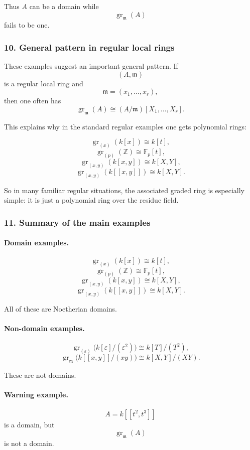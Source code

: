 \documentclass[12pt,a4paper]{article}
\theoremstyle{notespace}
\theoremstyle{definition}
\begin{document}
Thus \(A\) can be a domain while
\[
\operatorname{gr}_{\mathfrak m}(A)
\]
fails to be one.

\subsubsection{10. General pattern in regular local rings}

These examples suggest an important general pattern. If
\[
(A,\mathfrak m)
\]
is a regular local ring and
\[
\mathfrak m=(x_1,\dots,x_r),
\]
then one often has
\[
\operatorname{gr}_{\mathfrak m}(A)\cong (A/\mathfrak m)[X_1,\dots,X_r].
\]

This explains why in the standard regular examples one gets polynomial rings:

\[
\operatorname{gr}_{(x)}(k[x])\cong k[t],
\]
\[
\operatorname{gr}_{(p)}(\mathbb Z)\cong \mathbb F_p[t],
\]
\[
\operatorname{gr}_{(x,y)}(k[x,y])\cong k[X,Y],
\]
\[
\operatorname{gr}_{(x,y)}(k[[x,y]])\cong k[X,Y].
\]

So in many familiar regular situations, the associated graded ring is especially simple: it is just a polynomial ring over the residue field.

\subsubsection{11. Summary of the main examples}

\paragraph{Domain examples.}
\[
\operatorname{gr}_{(x)}(k[x])\cong k[t],
\]
\[
\operatorname{gr}_{(p)}(\mathbb Z)\cong \mathbb F_p[t],
\]
\[
\operatorname{gr}_{(x,y)}(k[x,y])\cong k[X,Y],
\]
\[
\operatorname{gr}_{(x,y)}(k[[x,y]])\cong k[X,Y].
\]

All of these are Noetherian domains.

\paragraph{Non-domain examples.}
\[
\operatorname{gr}_{(\varepsilon)}\bigl(k[\varepsilon]/(\varepsilon^2)\bigr)\cong k[T]/(T^2),
\]
\[
\operatorname{gr}_{\mathfrak m}\bigl(k[[x,y]]/(xy)\bigr)\cong k[X,Y]/(XY).
\]

These are not domains.

\paragraph{Warning example.}
\[
A=k[[t^2,t^3]]
\]
is a domain, but
\[
\operatorname{gr}_{\mathfrak m}(A)
\]
is not a domain.
\end{document}
